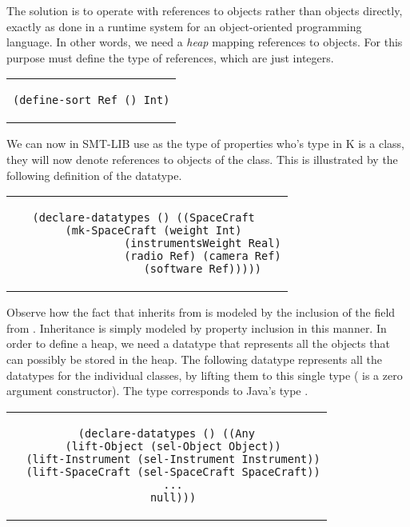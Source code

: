 The solution is to operate with references to objects
rather than objects directly, exactly as done in a runtime system for an
object-oriented programming language. In other words, we need a
{\em heap} mapping references to objects. For this purpose must define
the type of references, which are just integers.

\begin{center}
\begin{tabular}{c}
\begin{lstlisting}
(define-sort Ref () Int)
\end{lstlisting}
\end{tabular}
\end{center}

We can now in SMT-LIB use  as the type of properties who's 
type in K is a class, they will now denote references to objects of the class.
This is illustrated by the following definition of the  datatype.

\begin{center}
\begin{tabular}{c}
\begin{lstlisting}  
(declare-datatypes () ((SpaceCraft 
  (mk-SpaceCraft (weight Int)
                 (instrumentsWeight Real)
                 (radio Ref) (camera Ref)
                 (software Ref)))))
\end{lstlisting}
\end{tabular}
\end{center}

Observe how the fact that  inherits from
 is modeled by the inclusion of the  field
from . Inheritance is simply modeled by property
inclusion in this manner.  In order to define a heap, we need a
datatype that represents all the objects that can possibly be stored
in the heap. The following datatype  represents all the
datatypes for the individual classes, by lifting them to this single
type ( is a zero argument constructor). The type 
corresponds to Java's type .

\begin{center}
\begin{tabular}{c}
\begin{lstlisting}
(declare-datatypes () ((Any
  (lift-Object (sel-Object Object))
  (lift-Instrument (sel-Instrument Instrument))
  (lift-SpaceCraft (sel-SpaceCraft SpaceCraft))
  ...
  null)))
\end{lstlisting}
\end{tabular}
\end{center}

